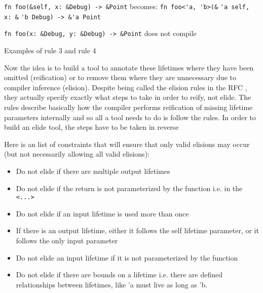 \begin{fig}
{\verb|fn foo(&self, x: &Debug) -> &Point|}\newline
becomes: {\verb|fn foo<'a, 'b>(&|}
{\color{green} \verb|'a|}{\verb| self, x: &|}{\color{red} \verb|'b|}{\verb| Debug) -> &|}{\color{blue}\verb|'a|}{\verb| Point|}


\vspace{4mm}
{\verb|fn foo(x: &Debug, y: &Debug) -> &Point|}\newline
does not compile

\caption{Examples of rule 3 and rule 4}
\label{Fig:lifetimes4}
\end{fig}

Now the idea is to build a tool to annotate these lifetimes where they have been omitted (reification) or to remove them where they are unnecessary due to compiler inference (elision). Despite being called the elision rules in the RFC \cite{elisionrules}, they actually specify exactly what steps to take in order to reify, not elide. The rules describe basically how the compiler performs reification of missing lifetime parameters internally and so all a tool needs to do is follow the rules. In order to build an elide tool, the steps have to be taken in reverse 


Here is an list of constraints that will ensure that only valid elisions may occur (but not necessarily allowing all valid elisions):
\begin{itemize}
\item Do not elide if there are multiple output lifetimes
\item Do not elide if the return is not parameterized by the function i.e. in the {\verb|<...>|}
\item Do not elide if an input lifetime is used more than once
\item If there is an output lifetime, either it follows the self lifetime parameter, or it follows the only input parameter
\item Do not elide an input lifetime if it is not parameterized by the function
\item Do not elide if there are bounds on a lifetime i.e. there are defined relationships between lifetimes, like 'a must live as long as 'b.
\end{itemize}

